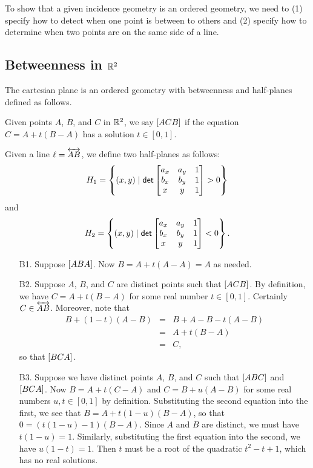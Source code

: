 To show that a given incidence geometry is an ordered geometry, we need to (1) specify how to detect when one point is between to others and (2) specify how to determine when two points are on the same side of a line.

\subsection{Betweenness in \(\mathbb{R}^2\)}

\begin{prop}
The cartesian plane is an ordered geometry with betweenness and half-planes defined as follows.
\begin{proplist}
\item Given points \(A\), \(B\), and \(C\) in \(\mathbb{R}^2\), we say \([ A C B ]\) if the equation \(C = A + t(B-A)\) has a solution \(t \in [0,1]\).
\item Given a line \(\ell = \overleftrightarrow{AB}\), we define two half-planes as follows: \[ H_1 = \left\{ (x, y) \mid \mathsf{det} \begin{bmatrix} a_x & a_y & 1 \\ b_x & b_y & 1 \\ x & y & 1 \end{bmatrix} > 0 \right\} \] and \[ H_2 = \left\{ (x, y) \mid \mathsf{det} \begin{bmatrix} a_x & a_y & 1 \\ b_x & b_y & 1 \\ x & y & 1 \end{bmatrix} < 0 \right\}. \]
\end{proplist}
\end{prop}

\begin{itemize}
\item[B1.] Suppose \([ A B A ]\).
Now \(B = A + t(A - A) = A\) as needed.
\item[B2.] Suppose \(A\), \(B\), and \(C\) are distinct points such that \([ A C B ]\).
By definition, we have \(C = A + t(B-A)\) for some real number \(t \in [0,1]\).
Certainly \(C \in \overleftrightarrow{AB}\).
Moreover, note that
\begin{eqnarray*}
B + (1-t)(A-B) & = & B + A - B - t(A-B) \\
 & = & A + t(B-A) \\
 & = & C,
\end{eqnarray*}
so that \([ B C A ]\).
\item[B3.] Suppose we have distinct points \(A\), \(B\), and \(C\) such that \([ A B C ]\) and \([ B C A ]\).
Now \(B = A + t(C-A)\) and \(C = B + u(A-B)\) for some real numbers \(u,t \in [0,1]\) by definition.
Substituting the second equation into the first, we see that \(B = A + t(1-u)(B - A)\), so that \(0 = (t(1-u) - 1)(B - A)\).
Since \(A\) and \(B\) are distinct, we must have \(t(1-u) = 1\).
Similarly, substituting the first equation into the second, we have \(u(1-t) = 1\).
Then \(t\) must be a root of the quadratic \(t^2 - t + 1\), which has no real solutions.
\end{itemize}

